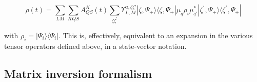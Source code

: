 \documentclass[10pt]{article}
\begin{document}


\begin{equation}
\rho(t) =\sum_{LM}\sum_{KQS}A^{K}_{QS}(t)\sum_{\zeta\zeta^{\prime}}\varUpsilon_{L,M}^{u,\zeta\zeta'}|\zeta,\Psi_+\rangle\langle\zeta,\Psi_+|\mu_q\rho_i\mu_{q\prime}^{*}|\zeta^{\prime},\Psi_+\rangle\langle\zeta^{\prime},\Psi_+|
\end{equation}


with $\rho_i = |\Psi_i\rangle\langle\Psi_i|$. This is, effectively, equivalent to an expansion in the various tensor operators defined above, in a state-vector notation.




\subsection{Matrix inversion formalism\label{app:mat-inversion}}



\end{document}
